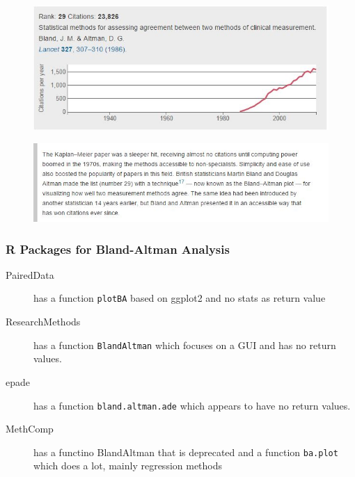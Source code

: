 \documentclass[compress]{beamer}        %
\begin{document}
\begin{frame}
	\begin{figure}
		\centering
		\includegraphics[width=0.99\linewidth]{BACITE1}
		
		\label{fig:BACITE1}
	\end{figure}
	
\end{frame}
\begin{frame}
	\begin{figure}
		\centering
		\includegraphics[width=0.99\linewidth]{BACITE2}
		
		\label{fig:BACITE2}
	\end{figure}
	
\end{frame}
\begin{frame}
\frametitle{R Packages for Bland-Altman Analysis}
\large
\begin{description}
	\item[PairedData] has a function \texttt{plotBA} based on ggplot2 and no stats as return value
	\item[ResearchMethods] has a function \texttt{BlandAltman} which focuses on a GUI and has no return values.
	\item[epade] has a function \texttt{bland.altman.ade} which appears to have no return values.
	\item[MethComp] has a functino BlandAltman that is deprecated and a function \texttt{ba.plot} which does a lot, mainly regression methods
\end{description}
	\end{frame}
\end{document}
